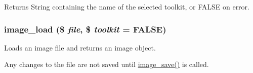 \begin{DoxyReturn}{Returns}
String containing the name of the selected toolkit, or FALSE on error. 
\end{DoxyReturn}
\hypertarget{group__image_ga96098e5b039dc3906a656fa889a04776}{
\subsubsection[{image\_\-load}]{\setlength{\rightskip}{0pt plus 5cm}image\_\-load (\$ {\em file}, \/  \$ {\em toolkit} = {\ttfamily FALSE})}}
\label{group__image_ga96098e5b039dc3906a656fa889a04776}
Loads an image file and returns an image object.

Any changes to the file are not saved until \hyperlink{group__image_ga134df2e4d035378b52e866618c164f3b}{image\_\-save()} is called.


